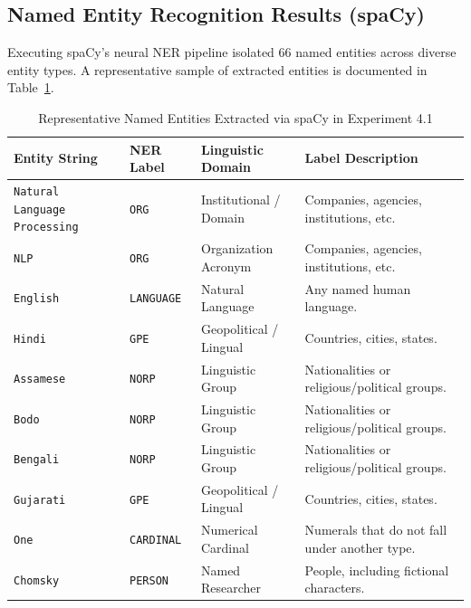 \documentclass[12pt,a4paper]{report}
\begin{document}
\subsection{Named Entity Recognition Results (spaCy)}
Executing spaCy's neural NER pipeline isolated 66 named entities across diverse entity types. A representative sample of extracted entities is documented in Table~\ref{tab:exp4_ner_sample}.
\begin{table}[H]
\centering
\small
\caption{Representative Named Entities Extracted via spaCy in Experiment 4.1}
\label{tab:exp4_ner_sample}
\begin{tabularx}{\textwidth}{lllX}
\toprule
\textbf{Entity String} & \textbf{NER Label} & \textbf{Linguistic Domain} & \textbf{Label Description} \\
\midrule
\texttt{Natural Language Processing} & \texttt{ORG} & Institutional / Domain & Companies, agencies, institutions, etc. \\
\texttt{NLP} & \texttt{ORG} & Organization Acronym & Companies, agencies, institutions, etc. \\
\texttt{English} & \texttt{LANGUAGE} & Natural Language & Any named human language. \\
\texttt{Hindi} & \texttt{GPE} & Geopolitical / Lingual & Countries, cities, states. \\
\texttt{Assamese} & \texttt{NORP} & Linguistic Group & Nationalities or religious/political groups. \\
\texttt{Bodo} & \texttt{NORP} & Linguistic Group & Nationalities or religious/political groups. \\
\texttt{Bengali} & \texttt{NORP} & Linguistic Group & Nationalities or religious/political groups. \\
\texttt{Gujarati} & \texttt{GPE} & Geopolitical / Lingual & Countries, cities, states. \\
\texttt{One} & \texttt{CARDINAL} & Numerical Cardinal & Numerals that do not fall under another type. \\
\texttt{Chomsky} & \texttt{PERSON} & Named Researcher & People, including fictional characters. \\
\bottomrule
\end{tabularx}
\end{table}
\end{document}
